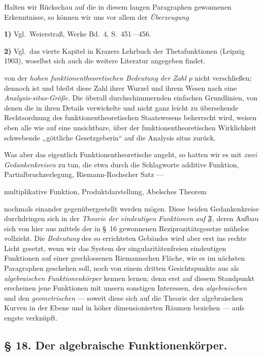 \documentclass{article}
\begin{document}
Halten wir Rückschau auf die in diesem langen Paragraphen gewonnenen Erkenntnisse, so können wir uns vor allem der \emph{Überzeugung}

\textbf{1)} Vgl.\ Weierstraß, Werke Bd.~4, S.~451---456.

\textbf{2)} Vgl.\ das vierte Kapitel in Krazers Lehrbuch der Thetafunktionen (Leipzig 1903), woselbst sich auch die weitere Literatur angegeben findet.

von der \emph{hohen funktionentheoretischen Bedeutung der Zahl $p$} nicht verschließen; dennoch ist und bleibt diese Zahl ihrer Wurzel und ihrem Wesen nach eine \emph{Analysis-situs-Größe}. Die überall durchschimmernden einfachen Grundlinien, von denen die in ihren Details verwickelte und nicht ganz leicht zu übersehende Rechtsordnung des funktionentheoretischen Staatswesens beherrscht wird, weisen eben alle wie auf eine unsichtbare, über der funktionentheoretischen Wirklichkeit schwebende „göttliche Gesetzgeberin“ auf die Analysis situs zurück.

Was aber das eigentlich Funktionentheoretische angeht, so hatten wir es mit \emph{zwei Gedankenkreisen} zu tun, die etwa durch die Schlagworte
additive Funktion, Partialbruchzerlegung, Riemann-Rochscher Satz ---

multiplikative Funktion, Produktdarstellung, Abelsches Theorem

nochmals einander gegenübergestellt werden mögen. Diese beiden Gedankenkreise durchdringen sich in der \emph{Theorie der eindeutigen Funktionen auf $\mathfrak{F}$}, deren Aufbau sich von hier aus mittels der in §~16 gewonnenen Reziprozitätsgesetze mühelos vollzieht. Die \emph{Bedeutung} des so errichteten Gebäudes wird aber erst ins rechte Licht gesetzt, wenn wir das System der singularitätenfreien eindeutigen Funktionen auf einer geschlossenen Riemannschen Fläche, wie es im nächsten Paragraphen geschehen soll, noch von einem dritten Gesichtspunkte aus als \emph{algebraischen Funktionenkörper} kennen lernen; denn erst auf diesem Standpunkt erscheinen jene Funktionen mit unsern sonstigen Interessen, den \emph{algebraischen} und den \emph{geometrischen} --- soweit diese sich auf die Theorie der algebraischen Kurven in der Ebene und in höher dimensionierten Räumen beziehen --- aufs engste verknüpft.

\subsection*{§ 18. Der algebraische Funktionenkörper.}
\end{document}
